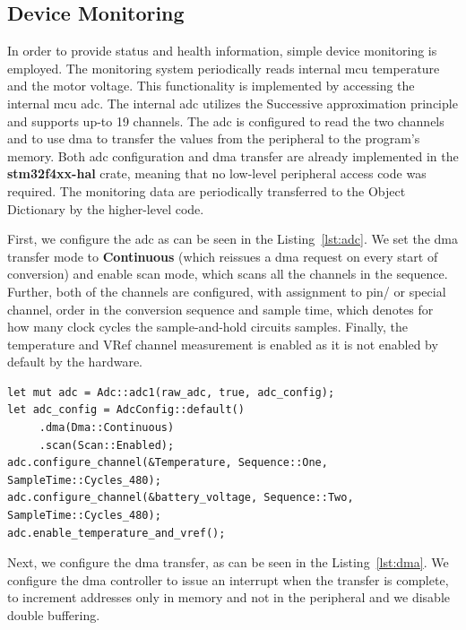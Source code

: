 \subsection{Device Monitoring}
\label{subsec:device_monitoring}
In order to provide status and health information, simple device monitoring is employed.
The monitoring system periodically reads internal \acs{mcu} temperature and the motor voltage.
This functionality is implemented by accessing the internal \acs{mcu} \acs{adc}.
The internal \acs{adc} utilizes the Successive approximation principle and supports up-to 19 channels\cite{stmicro_stm32f405xx_2020}.
The \acs{adc} is configured to read the two channels and to use \acs{dma} to transfer the values from the peripheral to the program's memory.
Both \acs{adc} configuration and \acs{dma} transfer are already implemented in the \textbf{stm32f4xx-hal} crate, meaning that no low-level peripheral access code was required.
The monitoring data are periodically transferred to the Object Dictionary by the higher-level code.

First, we configure the \acs{adc} as can be seen in the Listing~\ref{lst:adc}.
We set the \acs{dma} transfer mode to \textbf{Continuous} (which reissues a \acs{dma} request on every start of conversion) and enable scan mode, which scans all the channels in the sequence.
Further, both of the channels are configured, with assignment to pin/ or special channel, order in the conversion sequence and sample time, which denotes for how many clock cycles the sample-and-hold circuits samples.
Finally, the temperature and VRef channel measurement is enabled as it is not enabled by default by the hardware.

\begin{lstlisting}[caption={Configuring ADC for temperature and voltage monitoring.},label=lst:adc]
let mut adc = Adc::adc1(raw_adc, true, adc_config);
let adc_config = AdcConfig::default()
     .dma(Dma::Continuous)
     .scan(Scan::Enabled);
adc.configure_channel(&Temperature, Sequence::One, SampleTime::Cycles_480);
adc.configure_channel(&battery_voltage, Sequence::Two, SampleTime::Cycles_480);
adc.enable_temperature_and_vref();
\end{lstlisting}

Next, we configure the \acs{dma} transfer, as can be seen in the Listing~\ref{lst:dma}.
We configure the \acs{dma} controller to issue an interrupt when the transfer is complete, to increment addresses only in memory and not in the peripheral and we disable double buffering.

